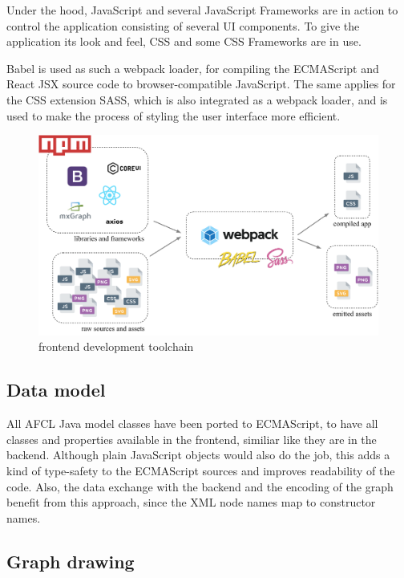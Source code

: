 \documentclass[a4paper,12pt,pdftex,halfparskip,cleardoubleempty,bibtotoc,liststotoc]{scrbook}
\begin{document}
Under the hood, JavaScript and several JavaScript Frameworks are in action to control the application consisting of several UI components. To give the application its look and feel, CSS and some CSS Frameworks are in use.

Babel is used as such a webpack loader, for compiling the ECMAScript and React JSX source code to browser-compatible JavaScript.
The same applies for the CSS extension SASS, which is also integrated as a webpack loader, and is used to make the process of styling the user interface more efficient.

\begin{figure}[htbp]
  \centering
  \vspace{0.8cm}
  \includegraphics[width=\textwidth]{frontend-setup}
  \caption{frontend development toolchain}
\end{figure}

\subsection{Data model}

All AFCL Java model classes have been ported to ECMAScript, to have all classes and properties available in the frontend, similiar like they are in the backend. Although plain JavaScript objects would also do the job, this adds a kind of type-safety to the ECMAScript sources and improves readability of the code. Also, the data exchange with the backend and the encoding of the graph benefit from this approach, since the XML node names map to constructor names.

\subsection{Graph drawing}
\end{document}
